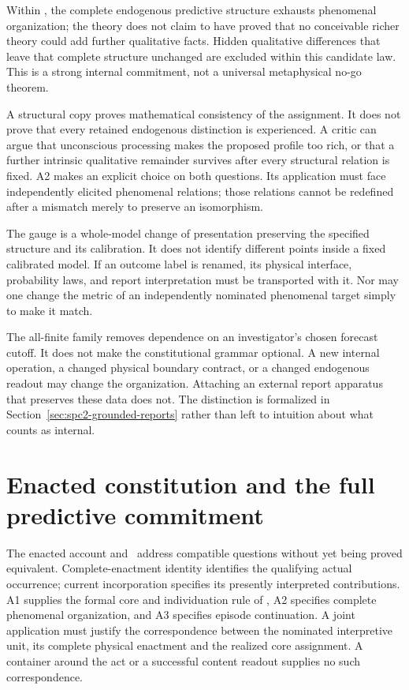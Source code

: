 Within \spctwo, the complete endogenous predictive structure exhausts phenomenal organization; the theory does not claim to have proved that no conceivable richer theory could add further qualitative facts. Hidden qualitative differences that leave that complete structure unchanged are excluded within this candidate law. This is a strong internal commitment, not a universal metaphysical no-go theorem.

A structural copy proves mathematical consistency of the assignment. It does not prove that every retained endogenous distinction is experienced. A critic can argue that unconscious processing makes the proposed profile too rich, or that a further intrinsic qualitative remainder survives after every structural relation is fixed. A2 makes an explicit choice on both questions. Its application must face independently elicited phenomenal relations; those relations cannot be redefined after a mismatch merely to preserve an isomorphism.

The gauge is a whole-model change of presentation preserving the specified structure and its calibration. It does not identify different points inside a fixed calibrated model. If an outcome label is renamed, its physical interface, probability laws, and report interpretation must be transported with it. Nor may one change the metric of an independently nominated phenomenal target simply to make it match.

The all-finite family removes dependence on an investigator's chosen forecast cutoff. It does not make the constitutional grammar optional. A new internal operation, a changed physical boundary contract, or a changed endogenous readout may change the organization. Attaching an external report apparatus that preserves these data does not. The distinction is formalized in Section~\ref{sec:spc2-grounded-reports} rather than left to intuition about what counts as internal.

\section{Enacted constitution and the full predictive commitment}\label{sec:enacted-spc-correspondence}
The enacted account and \spctwo\ address compatible questions without yet being proved equivalent. Complete-enactment identity identifies the qualifying actual occurrence; current incorporation specifies its presently interpreted contributions. A1 supplies the formal core and individuation rule of \spctwo, A2 specifies complete phenomenal organization, and A3 specifies episode continuation. A joint application must justify the correspondence between the nominated interpretive unit, its complete physical enactment and the realized core assignment. A container around the act or a successful content readout supplies no such correspondence.


